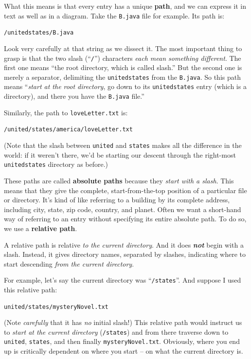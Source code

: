 What this means is that every entry has a unique \textbf{path}, and we can
express it in text as well as in a diagram. Take the \texttt{B.java} file for
example. Its path is:

\quad\quad \texttt{/unitedstates/B.java}

Look very carefully at that string as we dissect it. The most important thing
to grasp is that the two slash (``\texttt{/}'') characters \textit{each mean
something different}. The first one means ``the root directory, which is
called slash.'' But the second one is merely a separator, delimiting the
\texttt{unitedstates} from the \texttt{B.java}. So this path means
``\textit{start at the root directory}, go down to its \texttt{unitedstates}
entry (which is a directory), and there you have the \texttt{B.java} file.''

Similarly, the path to \texttt{loveLetter.txt} is:

\quad\quad \texttt{/united/states/america/loveLetter.txt}

(Note that the slash between \texttt{united} and \texttt{states} makes all the
difference in the world: if it weren't there, we'd be starting our descent
through the right-most \texttt{unitedstates} directory as before.)

These paths are called \textbf{absolute paths} because they \textit{start with
a slash}. This means that they give the complete, start-from-the-top position
of a particular file or directory. It's kind of like referring to a building
by its complete address, including city, state, zip code, country, and planet.
Often we want a short-hand way of referring to an entry without specifying its
entire absolute path. To do so, we use a \textbf{relative path}.

A relative path is relative \textit{to the current directory}. And it does
\textit{\textbf{not}} begin with a slash. Instead, it gives directory names,
separated by slashes, indicating where to start descending \textit{from the
current directory}.

For example, let's say the current directory was ``\texttt{/states}''. And
suppose I used this relative path:

\quad\quad \texttt{united/states/mysteryNovel.txt}

(Note \textit{carefully} that it has \textit{no} initial slash!) This relative
path would instruct us to \textit{start at the current directory}
(\texttt{/states}) and from there traverse down to \texttt{united},
\texttt{states}, and then finally \texttt{mysteryNovel.txt}. Obviously, where
you end up is critically dependent on where you start -- on what the current
directory is.

